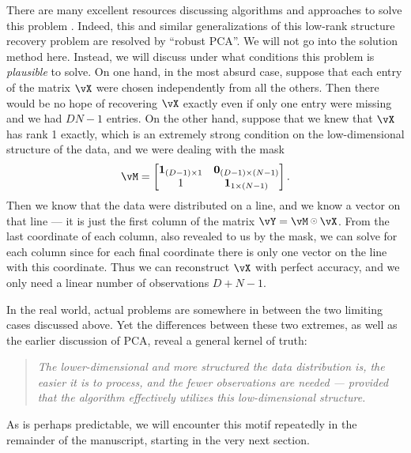 \documentclass[../../book-main.tex]{subfiles}
\begin{document}
There are many excellent resources discussing algorithms and approaches to solve this problem \cite{Wright-Ma-2022}. Indeed, this and similar generalizations of this low-rank structure recovery problem are resolved by ``robust PCA''. We will not go into the solution method here. Instead, we will discuss under what conditions this problem is \textit{plausible} to solve. On one hand, in the most absurd case, suppose that each entry of the matrix \(\vX\) were chosen independently from all the others. Then there would be no hope of recovering \(\vX\) exactly even if only one entry were missing and we had \(DN - 1\) entries. On the other hand, suppose that we knew that \(\vX\) has rank 1 exactly, which is an extremely strong condition on the low-dimensional structure of the data, and we were dealing with the mask
\begin{equation}
    \vM = \mat{\vone_{(D - 1) \times 1} & \vzero_{(D - 1) \times (N - 1)} \\ 1 & \vone_{1 \times (N - 1)} }.
\end{equation}
Then we know that the data were distributed on a line, and we know a vector on
that line --- it is just the first column of the matrix \(\vY = \vM \hada \vX\). From the last coordinate of each column, also revealed to us by the mask, we can solve for each column since for each final coordinate there is only one vector on the line with this coordinate. Thus we can reconstruct \(\vX\) with perfect accuracy, and we only need a linear number of observations \(D + N - 1\). 

In the real world, actual problems are somewhere in between the two limiting cases discussed above. Yet the differences between these two extremes, as well as the earlier discussion of PCA, reveal a general kernel of truth:
\begin{quote}
    \centering
    \textit{The lower-dimensional and more structured the data distribution is, the easier it is to process, and the fewer observations are needed --- provided that the algorithm effectively utilizes this low-dimensional structure.}
\end{quote}
As is perhaps predictable, we will encounter this motif repeatedly in the remainder of the manuscript, starting in the very next section.
\end{document}
